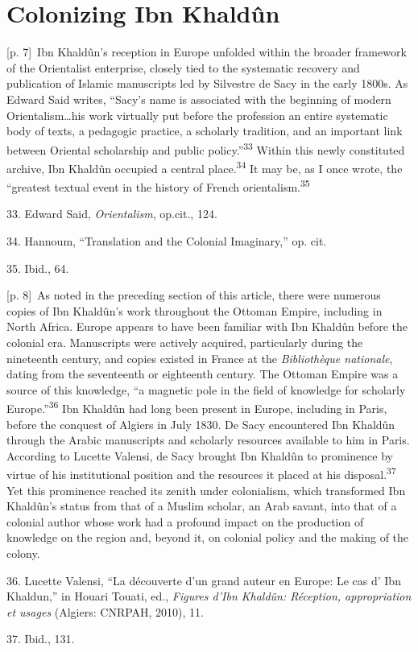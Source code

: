 \documentclass[10pt,a4paper]{article}
\begin{document}
\section*{Colonizing Ibn Khaldûn}
{\scriptsize\color{gray} [p. 7]}\ Ibn Khaldûn’s reception in Europe unfolded within the broader framework of the Orientalist enterprise, closely tied to the systematic recovery and publication of Islamic manuscripts led by Silvestre de Sacy in the early 1800s. As Edward Said writes, “Sacy’s name is associated with the beginning of modern Orientalism…his work virtually put before the profession an entire systematic body of texts, a pedagogic practice, a scholarly tradition, and an important link between Oriental scholarship and public policy.”\nobreak\textsuperscript{33} Within this newly constituted archive, Ibn Khaldûn occupied a central place.\nobreak\textsuperscript{34} It may be, as I once wrote, the “greatest textual event in the history of French orientalism.\nobreak\textsuperscript{35}\par{\small 33. Edward Said, \textit{Orientalism}, op.cit., 124.\par}{\small 34. Hannoum, “Translation and the Colonial Imaginary,” op. cit.\par}{\small 35. Ibid., 64.\par}
{\scriptsize\color{gray} [p. 8]}\ As noted in the preceding section of this article, there were numerous copies of Ibn Khaldûn’s work throughout the Ottoman Empire, including in North Africa. Europe appears to have been familiar with Ibn Khaldûn before the colonial era. Manuscripts were actively acquired, particularly during the nineteenth century, and copies existed in France at the \textit{Bibliothèque nationale}, dating from the seventeenth or eighteenth century. The Ottoman Empire was a source of this knowledge, “a magnetic pole in the field of knowledge for scholarly Europe.”\nobreak\textsuperscript{36} Ibn Khaldûn had long been present in Europe, including in Paris, before the conquest of Algiers in July 1830. De Sacy encountered Ibn Khaldûn through the Arabic manuscripts and scholarly resources available to him in Paris. According to Lucette Valensi, de Sacy brought Ibn Khaldûn to prominence by virtue of his institutional position and the resources it placed at his disposal.\nobreak\textsuperscript{37} Yet this prominence reached its zenith under colonialism, which transformed Ibn Khaldûn’s status from that of a Muslim scholar, an Arab savant, into that of a colonial author whose work had a profound impact on the production of knowledge on the region and, beyond it, on colonial policy and the making of the colony.\par{\small 36. Lucette Valensi, “La découverte d’un grand auteur en Europe: Le cas d’ Ibn Khaldun,” in Houari Touati, ed., \textit{Figures d’Ibn Khaldûn: Réception, appropriation et usages} (Algiers: CNRPAH, 2010), 11.\par}{\small 37. Ibid., 131.\par}
\end{document}
